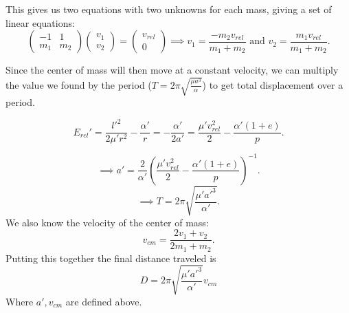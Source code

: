 \documentclass[letterpaper, reqno,11pt]{article}
\begin{document}
This gives us two equations with two unknowns for each mass, giving a set of linear equations:
\[
    \begin{pmatrix} -1&1\\m_1&m_2 \end{pmatrix} \begin{pmatrix} v_1\\v_2 \end{pmatrix}=\begin{pmatrix} v_{rel}\\0 \end{pmatrix}\implies v_1=\frac{-m_2v_{rel}}{m_1+m_2}\text{ and }v_2=\frac{m_1v_{rel}}{m_1+m_2}
.\]


Since the center of mass will then move at a constant velocity, we can multiply the value we found by the period ($T=2\pi\sqrt{\frac{\mu a^3}{\alpha}} $) to get total displacement over a period.  

\[
E_{rel}'=\frac{l'^2}{2\mu' r^2}-\frac{\alpha'}{r}=-\frac{\alpha'}{2a'}=\frac{\mu'v_{rel}^2}{2}-\frac{\alpha'(1+e)}{p}
.\]

\[
\implies a'=\frac{2}{\alpha'}\left( \frac{\mu'v_{rel}^2}{2}-\frac{\alpha'(1+e)}{p} \right)^{-1}
.\]
\[
\implies T=2\pi \sqrt{\frac{\mu' a'^3}{\alpha'}} 
.\]
We also know the velocity of the center of mass: 
\[
v_{cm}=\frac{2v_1+v_2}{2m_1+m_2}
.\]
Putting this together the final distance traveled is 
\[
D=2\pi \sqrt{\frac{\mu' a'^3}{\alpha'}}v_{cm}
\]
Where $a', v_{cm}$ are defined above. 



\end{document}
